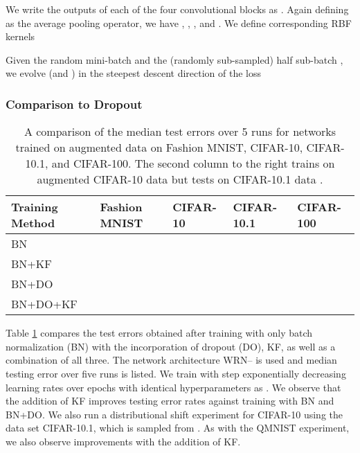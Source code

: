 \documentclass[11pt]{article}
\begin{document}
We write the outputs of each of the four convolutional blocks as .  Again defining  as the average pooling operator, we have , , , and .  We define corresponding RBF kernels



Given the random mini-batch  and the (randomly sub-sampled) half sub-batch , we evolve  (and ) in the steepest descent direction of the loss
{\small
}

\subsubsection{Comparison to Dropout}

\begin{table}[h]
\begin{center}
\begin{tabular}{ | p{3.4cm} || p{2.0cm} | p{2.0cm} | p{2.0cm}| p{2.0cm}|}
\hline
\textbf{Training Method} & \textbf{Fashion MNIST} & \textbf{CIFAR-10} & \textbf{CIFAR-10.1} & \textbf{CIFAR-100}\\
\hline
BN &  &  &  & \\

BN+KF &  &  &  & \\

BN+DO &  &  &  & \\

BN+DO+KF &  &  &  & \\
\hline


\end{tabular}
\end{center}
\caption{A comparison of the median test errors over 5 runs for networks trained on augmented data on Fashion MNIST, CIFAR-10, CIFAR-10.1, and CIFAR-100.  The second column to the right trains on augmented CIFAR-10 data but tests on CIFAR-10.1 data \cite{cifar101, 80M_tinyimages}.}\label{WRNKFvsDO}
\end{table}

Table \ref{WRNKFvsDO} compares the test errors obtained after training with only batch normalization (BN) with the incorporation of dropout (DO), KF, as well as a combination of all three.  The network architecture WRN-- is used and median testing error over five runs is listed.  We train with step exponentially decreasing learning rates over  epochs with identical hyperparameters as \cite{WRNZagKom}.  We observe that the addition of KF improves testing error rates against training with BN and BN+DO.  We also run a distributional shift experiment for CIFAR-10 using the data set CIFAR-10.1, \cite{cifar101} which is sampled from \cite{80M_tinyimages}.  As with the QMNIST experiment, we also observe improvements with the addition of KF.  
\end{document}
